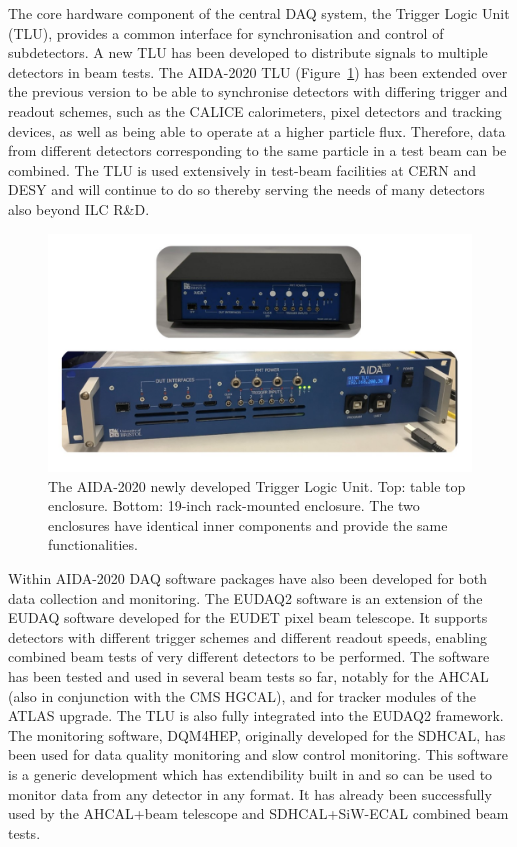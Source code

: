 The core hardware component of the central DAQ system, the Trigger Logic Unit (TLU), provides a common interface for synchronisation and control of subdetectors. A new TLU has been developed to distribute signals to multiple detectors in beam tests. The AIDA-2020 TLU (Figure~\ref{fig:integration:DAQ_TLU}) has been extended over the previous version to be able to synchronise detectors with differing trigger and readout schemes, such as the CALICE calorimeters, pixel detectors and tracking devices, as well as being able to operate at a higher particle flux. Therefore, data from different detectors corresponding to the same particle in a test beam can be combined. The TLU is used extensively in test-beam facilities at CERN and DESY and will continue to do so thereby serving the needs of many detectors also beyond ILC R\&D. 

\begin{figure}[t!]
\includegraphics[width=1.0\hsize]{Integration/fig/DAQ_TLU.jpg}
\caption{\label{fig:integration:DAQ_TLU}The AIDA-2020 newly developed Trigger Logic Unit. Top: table top enclosure. Bottom: 19-inch rack-mounted enclosure. The two enclosures have identical inner components and provide the same functionalities.}
\end{figure}

Within AIDA-2020 DAQ software packages have also been developed for both data collection and monitoring. The EUDAQ2 software is an extension of the EUDAQ software developed for the EUDET pixel beam telescope. It supports detectors with different trigger schemes and different readout speeds, enabling combined beam tests of very different detectors to be performed. The software has been tested and used in several beam tests so far, notably for the AHCAL (also in conjunction with the CMS HGCAL), and for tracker modules of the ATLAS upgrade.  The TLU is also fully integrated into the EUDAQ2 framework. The monitoring software, DQM4HEP, originally developed for the SDHCAL, has been used for data quality monitoring and slow control monitoring. This software is a generic development which has extendibility built in and so can be used to monitor data from any detector in any format. It has already been successfully used by the AHCAL+beam telescope and SDHCAL+SiW-ECAL combined beam tests. 

